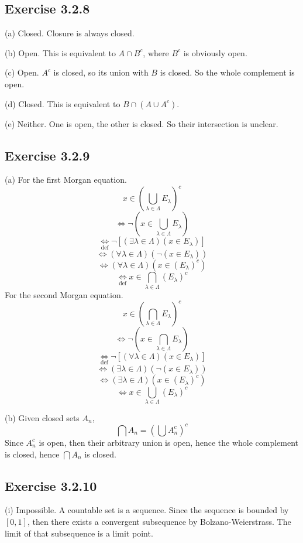 \documentclass{book}
\begin{document}
\subsection*{Exercise 3.2.8}
(a)
Closed. Closure is always closed.

\noindent
(b)
Open. This is equivalent to $A \cap B^c$, where $B^c$ is obviously open.

\noindent
(c)
Open. $A^c$ is closed, so its union with $B$ is closed. So the whole complement is open.

\noindent
(d)
Closed. This is equivalent to $B \cap (A \cup A^c)$.

\noindent
(e)
Neither. One is open, the other is closed. So their intersection is unclear.

\subsection*{Exercise 3.2.9}
(a)
For the first Morgan equation.
$$x \in \left( \bigcup_{\lambda \in \Lambda} E_\lambda \right)^c$$
$$\Leftrightarrow \neg \left( x \in \bigcup_{\lambda \in \Lambda} E_\lambda \right)$$
$$\underset{\text{def}}{\Leftrightarrow} \neg [(\exists \lambda \in \Lambda)(x \in E_\lambda)]$$
$$\Leftrightarrow (\forall \lambda \in \Lambda) (\neg (x \in E_\lambda))$$
$$\Leftrightarrow (\forall \lambda \in \Lambda) (x \in (E_\lambda)^c)$$
$$\underset{\text{def}}{\Leftrightarrow} x \in \bigcap_{\lambda \in \Lambda} (E_\lambda)^c$$
For the second Morgan equation.
$$x \in \left( \bigcap_{\lambda \in \Lambda} E_\lambda \right)^c$$
$$\Leftrightarrow \neg \left( x \in \bigcap_{\lambda \in \Lambda} E_\lambda \right)$$
$$\underset{\text{def}}{\Leftrightarrow} \neg [(\forall \lambda \in \Lambda)(x \in E_\lambda)]$$
$$\Leftrightarrow (\exists \lambda \in \Lambda) (\neg (x \in E_\lambda))$$
$$\Leftrightarrow (\exists \lambda \in \Lambda) (x \in (E_\lambda)^c)$$
$$\Leftrightarrow x \in \bigcup_{\lambda \in \Lambda} (E_\lambda)^c$$

\noindent
(b)
Given closed sets $A_n$,
$$\bigcap A_n = \left( \bigcup A_n^c \right)^c$$
Since $A_n^c$ is open, then their arbitrary union is open, hence the whole complement is closed, hence $\bigcap A_n$ is closed.

\subsection*{Exercise 3.2.10}
(i)
Impossible. A countable set is a sequence. Since the sequence is bounded by $[0, 1]$, then there exists a convergent subsequence by Bolzano-Weierstrass. The limit of that subsequence is a limit point.
\end{document}
